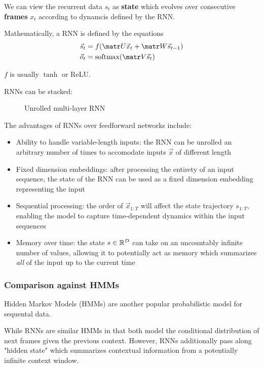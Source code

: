 We can view the recurrent data $s_t$ as \textbf{state} which evolves
over consecutive \textbf{frames} $x_t$ according to dynamcis defined
by the RNN.

Mathematically, a RNN is defined by the equations
\begin{align}
    \s_t &= f(\U \x_t + \W \s_{t-1}) \\
    \o_t &= \softmax( \V \s_t)
\end{align}

$f$ is usually $\tanh$ or ReLU.

RNNs can be stacked:

\begin{figure}[htpb]
    \centering
    
    \caption{Unrolled multi-layer RNN}
    \label{fig:rnn-multi-unrolled}
\end{figure}


The advantages of RNNs over feedforward networks include:
\begin{itemize}
    \item Ability to handle variable-length inputs: the RNN can be unrolled an arbitrary
        number of times to accomodate inputs $\vec{x}$ of different length
    \item Fixed dimension embeddings: after processing the entirety of an input
        sequence, the state of the RNN can be used as a fixed dimension embedding
        representing the input
    \item Sequential processing: the order of $\vec{x}_{1:T}$ will affect the state
        trajectory $s_{1:T}$, enabling the model to capture time-dependent dynamics
        within the input sequences
    \item Memory over time: the state $s \in \mathbb{R}^D$ can take on an uncountably infinite
        number of values, allowing it to potentially act as memory which summarizes
        \emph{all} of the input up to the current time
\end{itemize}

\subsubsection{Comparison against HMMs}

Hidden Markov Models (HMMs) are another popular probabilistic model for
sequental data. 

While RNNs are similar HMMs in that both model the conditional distribution of
next frames given the previous context. However, RNNs additionally pass along
"hidden state" which summarizes contextual information from a potentially
infinite context window.

